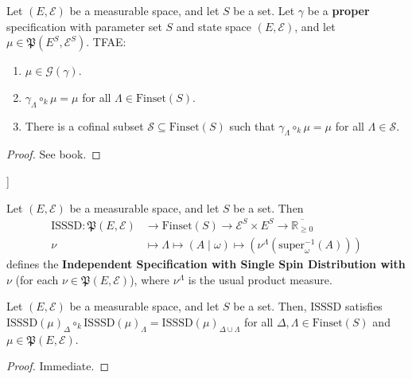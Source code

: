 \begin{lemma}
    \label{lem:gibbs-measure-char}

    Let $(E, \mathcal{E})$ be a measurable space, and let $S$ be a set. Let $\gamma$ be a \textbf{proper} specification with parameter set $S$ and state space $(E, \mathcal{E})$, and let $\mu\in\mathfrak{P}(E^S, \mathcal{E}^S)$. TFAE:
    \begin{enumerate}
        \item $\mu\in\mathcal{G}(\gamma)$.
        \item $\gamma_\Lambda\circ_k\mu=\mu$ for all $\Lambda\in\text{Finset}(S)$.
        \item There is a cofinal subset $\mathcal{S}\subseteq\text{Finset}(S)$ such that $\gamma_\Lambda\circ_k\mu=\mu$ for all $\Lambda\in\mathcal{S}$.
    \end{enumerate}
\end{lemma}
\begin{proof}

  See book.
\end{proof}

\begin{definition}[Independent Specification with Single Spin Distribution [ISSSD]]
    \label{def:ISSSD}

    Let $(E, \mathcal{E})$ be a measurable space, and let $S$ be a set. Then
    \begin{align*}
        \text{ISSSD}:\mathfrak{P}(E, \mathcal{E})&\to\text{Finset}(S)\to\mathcal{E}^S\times E^S\to\overline{\mathbb{R}_{\geq0}}\\
        \nu&\mapsto\Lambda\mapsto(A\mid\omega)\mapsto\left(\nu^\Lambda\left(\text{super}_\omega^{-1}(A)\right)\right)
    \end{align*}
    defines the \textbf{Independent Specification with Single Spin Distribution with $\nu$} (for each $\nu\in\mathfrak{P}(E, \mathcal{E})$), where $\nu^\Lambda$ is the usual product measure.
\end{definition}

\begin{lemma}
    \label{lem:isssd-strong-consistency}
    \leanok

    Let $(E, \mathcal{E})$ be a measurable space, and let $S$ be a set. Then, $\text{ISSSD}$ satisfies $\text{ISSSD}(\mu)_\Delta\circ_k\text{ISSSD}(\mu)_\Lambda=\text{ISSSD}(\mu)_{\Delta\cup\Lambda}$ for all $\Delta, \Lambda\in\text{Finset}(S)$ and $\mu\in\mathfrak{P}(E, \mathcal{E})$.
\end{lemma}
\begin{proof}

  Immediate.
\end{proof}

